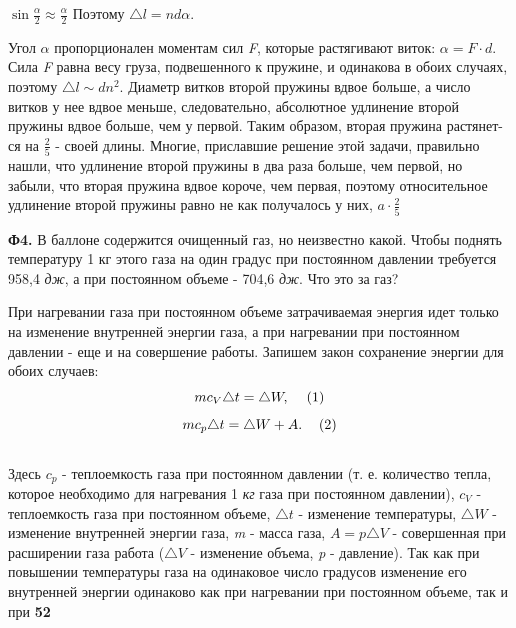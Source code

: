 \documentclass{article}
\begin{document}
\begin{multicols}{2}
		\Large{$\sin{\frac{\alpha}{2}} \approx \frac{\alpha}{2}$} Поэтому \Large{$\triangle l = nd\alpha$}.
		\vspace{-1cm}
		\par
		Угол $\alpha$ пропорционален моментам
		\columnbreak
		сил \emph{F}, которые растягивают виток: $\alpha = F \cdot d$. Сила \emph{F} равна весу груза, подвешенного к пружине, и одинакова в обоих случаях, поэтому $\triangle l \sim dn^2$.
		Диаметр витков второй пружины вдвое больше, а число витков у нее вдвое меньше, следовательно, абсолютное удлинение второй пружины вдвое больше, чем у первой. Таким образом, вторая пружина растянет-
		ся на $\frac{2}{5}$ - своей длины.
		Многие, приславшие решение этой задачи, правильно нашли, что удлинение второй пружины в два раза больше, чем первой, но забыли, что вторая пружина вдвое короче, чем первая, поэтому относительное удлинение второй пружины равно не
		как получалось у них, $a \cdot \frac{2}{5}$
		\par
		{\small\textbf{Ф4.} В баллоне содержится очищенный газ, но неизвестно какой. Чтобы поднять температуру 1 кг этого газа на один градус при постоянном давлении требуется 958,4 \emph{дж}, а при постоянном объеме - 704,6 \emph{дж}. Что это за газ?}
		\par
		При нагревании газа при постоянном объеме затрачиваемая энергия идет только на изменение внутренней энергии газа, а при нагревании при постоянном давлении - еще и на совершение работы. Запишем закон сохранение энергии для обоих случаев:\\
		\[mc_{V}\triangle t = \triangle W, \hspace{12px}(1)\] 
		\[mc_{p}\triangle t = \triangle W + A.\hspace{12px}(2)\]\\
		Здесь $c_{p}$ - теплоемкость газа при постоянном давлении (т. е. количество тепла, которое необходимо для нагревания 1 \emph{кг} газа при постоянном давлении), $c_{V}$ - теплоемкость газа при постоянном объеме, $\triangle t$ - изменение температуры, $\triangle W$ - изменение внутренней энергии газа, \emph{m} - масса газа, $A = p\triangle V$ - совершенная при расширении газа работа ($\triangle V$ - изменение объема, \emph{p} - давление).
		Так как при повышении температуры газа на одинаковое число градусов изменение его внутренней энергии одинаково как при нагревании при постоянном объеме, так и при \hfill {\small\textbf{52}}
	\end{multicols}
	
\end{document}
